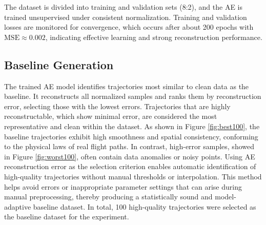 The dataset is divided into training and validation sets (8:2), and the AE is trained unsupervised under consistent normalization. Training and validation losses are monitored for convergence, which occurs after about 200 epochs with $\mathrm{MSE} \approx 0.002$, indicating effective learning and strong reconstruction performance.

\subsection{Baseline Generation}
The trained AE model identifies trajectories most similar to clean data as the baseline. It reconstructs all normalized samples and ranks them by reconstruction error, selecting those with the lowest errors.
Trajectories that are highly reconstructable, which show minimal error, are considered the most representative and clean within the dataset.
As shown in Figure \ref{fig:best100}, the baseline trajectories exhibit high smoothness and spatial consistency, conforming to the physical laws of real flight paths. In contrast, high-error samples, showed in Figure \ref{fig:worst100}, often contain data anomalies or noisy points.
Using AE reconstruction error as the selection criterion enables automatic identification of high-quality trajectories without manual thresholds or interpolation. This method helps avoid errors or inappropriate parameter settings that can arise during manual preprocessing, thereby producing a statistically sound and model-adaptive baseline dataset. In total, 100 high-quality trajectories were selected as the baseline dataset for the experiment.


